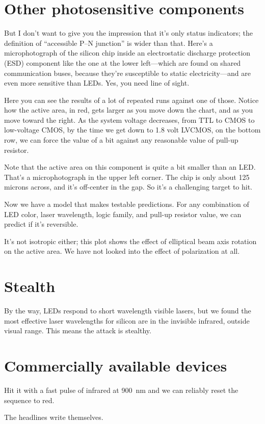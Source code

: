 \documentclass[letterpaper]{article}
\begin{document}
\section{Other photosensitive components}
But I don't want to give you the impression that it's only status indicators;
the definition of ``accessible P--N junction'' is wider than that. Here's a
microphotograph of the silicon chip inside an electrostatic discharge
protection (ESD) component like the one at the lower left---which are found on
shared communication buses, because they're susceptible to static
electricity---and are even more sensitive than LEDs. Yes, you need line of
sight.

Here you can see the results of a lot of repeated runs against one of those.
Notice how the active area, in red, gets larger as you move down the chart, and
as you move toward the right. As the system voltage decreases, from TTL to CMOS
to low-voltage CMOS, by the time we get down to 1.8 volt LVCMOS, on the bottom
row, we can force the value of a bit against any reasonable value of pull-up
resistor.

Note that the active area on this component is quite a bit smaller than an LED.
That's a microphotograph in the upper left corner. The chip is only about 125
microns across, and it's off-center in the gap. So it's a challenging target to
hit.

Now we have a model that makes testable predictions. For any combination of LED
color, laser wavelength, logic family, and pull-up resistor value, we can
predict if it's reversible.

It's not isotropic either; this plot shows the effect of elliptical beam axis
rotation on the active area. We have not looked into the effect of polarization
at all.
\section{Stealth}
By the way, LEDs respond to short wavelength visible lasers, but we found the
most effective laser wavelengths for silicon are in the invisible infrared,
outside visual range. This means the attack is stealthy.
\section{Commercially available devices}
Hit it with a fast pulse of infrared at \SI{900}{\nano\metre} and we can
reliably reset the sequence to red.

The headlines write themselves.
\end{document}
